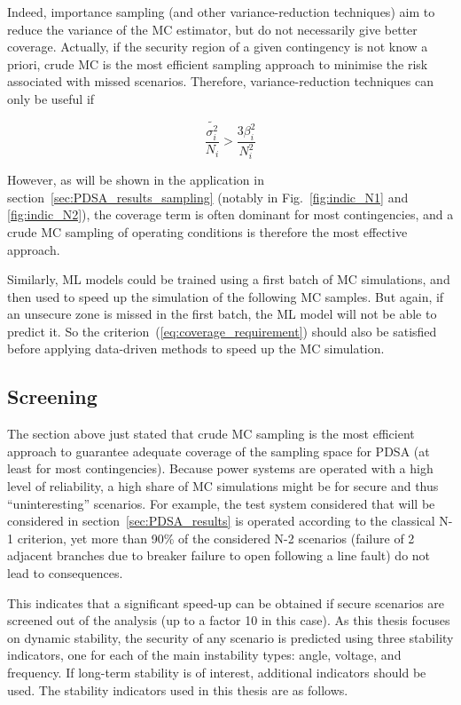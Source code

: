 Indeed, importance sampling (and other variance-reduction techniques) aim to reduce the variance of the MC estimator, but do not necessarily give better coverage. Actually, if the security region of a given contingency is not know a priori, crude MC is the most efficient sampling approach to minimise the risk associated with missed scenarios. Therefore, variance-reduction techniques can only be useful if

\begin{equation}
  \label{eq:coverage_requirement}
  \frac{\tilde{\sigma_i^2}}{N_i} > \frac{3 \beta_i^2}{N_i^2}
\end{equation}

However, as will be shown in the application in section~\ref{sec:PDSA_results_sampling} (notably in Fig.~\ref{fig:indic_N1} and \ref{fig:indic_N2}), the coverage term is often dominant for most contingencies, and a crude MC sampling of operating conditions is therefore the most effective approach.

Similarly, ML models could be trained using a first batch of MC simulations, and then used to speed up the simulation of the following MC samples. But again, if an unsecure zone is missed in the first batch, the ML model will not be able to predict it. So the criterion~(\ref{eq:coverage_requirement}) should also be satisfied before applying data-driven methods to speed up the MC simulation.



\subsection{Screening}
\label{sec:screening}

The section above just stated that crude MC sampling is the most efficient approach to guarantee adequate coverage of the sampling space for PDSA (at least for most contingencies). Because power systems are operated with a high level of reliability, a high share of MC simulations might be for secure and thus ``uninteresting'' scenarios. For example, the test system considered that will be considered in section~\ref{sec:PDSA_results} is operated according to the classical N-1 criterion, yet more than 90\% of the considered N-2 scenarios (failure of 2 adjacent branches due to breaker failure to open following a line fault) do not lead to consequences.

This indicates that a significant speed-up can be obtained if secure scenarios are screened out of the analysis (up to a factor 10 in this case). As this thesis focuses on dynamic stability, the security of any scenario is predicted using three stability indicators, one for each of the main instability types: angle, voltage, and frequency. If long-term stability is of interest, additional indicators should be used. The stability indicators used in this thesis are as follows.

